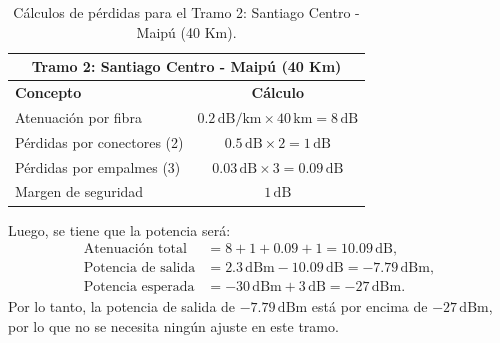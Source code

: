 \begin{itemize}
\begin{table}[H]
	\centering
	\renewcommand{\arraystretch}{1.5} %
	\begin{tabular}{|l|c|}
	\hline
	\multicolumn{2}{|c|}{\textbf{Tramo 2: Santiago Centro - Maipú (40 Km)}} \\ \hline
	\textbf{Concepto}               & \textbf{Cálculo}                               \\ \hline
	Atenuación por fibra            & $0.2 \, \text{dB/km} \times 40 \, \text{km} = 8 \, \text{dB}$ \\ \hline
	Pérdidas por conectores (2)     & $0.5 \, \text{dB} \times 2 = 1 \, \text{dB}$    \\ \hline
	Pérdidas por empalmes (3)       & $0.03 \, \text{dB} \times 3 = 0.09 \, \text{dB}$ \\ \hline
	Margen de seguridad             & $1 \, \text{dB}$                               \\ \hline
	\end{tabular}
	\caption{Cálculos de pérdidas para el Tramo 2: Santiago Centro - Maipú (40 Km).}
	\label{tabla:tramo2}
\end{table}
Luego, se tiene que la potencia será:
\begin{align}
\text{Atenuación total} &= 8 + 1 + 0.09 + 1 = 10.09 \, \text{dB}, \\
\text{Potencia de salida} &= 2.3 \, \text{dBm} - 10.09 \, \text{dB} = -7.79 \, \text{dBm}, \\
\text{Potencia esperada} &= -30 \, \text{dBm} + 3 \, \text{dB} = -27 \, \text{dBm}.
\end{align}
Por lo tanto, la potencia de salida de \(-7.79 \, \text{dBm}\) está por encima de \(-27 \, \text{dBm}\), por lo que no se necesita ningún ajuste en este tramo.


\end{itemize}
